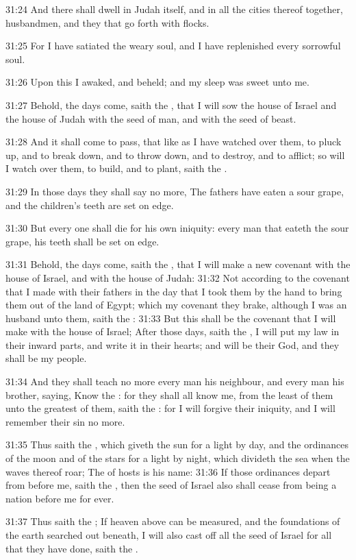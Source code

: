 31:24 And there shall dwell in Judah itself, and in all the cities thereof together, husbandmen, and they that go forth with flocks.

31:25 For I have satiated the weary soul, and I have replenished every sorrowful soul.

31:26 Upon this I awaked, and beheld; and my sleep was sweet unto me.

31:27 Behold, the days come, saith the \LORD, that I will sow the house of Israel and the house of Judah with the seed of man, and with the seed of beast.

31:28 And it shall come to pass, that like as I have watched over them, to pluck up, and to break down, and to throw down, and to destroy, and to afflict; so will I watch over them, to build, and to plant, saith the \LORD.

31:29 In those days they shall say no more, The fathers have eaten a sour grape, and the children's teeth are set on edge.

31:30 But every one shall die for his own iniquity: every man that eateth the sour grape, his teeth shall be set on edge.

31:31 Behold, the days come, saith the \LORD, that I will make a new covenant with the house of Israel, and with the house of Judah: 31:32 Not according to the covenant that I made with their fathers in the day that I took them by the hand to bring them out of the land of Egypt; which my covenant they brake, although I was an husband unto them, saith the \LORD: 31:33 But this shall be the covenant that I will make with the house of Israel; After those days, saith the \LORD, I will put my law in their inward parts, and write it in their hearts; and will be their God, and they shall be my people.

31:34 And they shall teach no more every man his neighbour, and every man his brother, saying, Know the \LORD: for they shall all know me, from the least of them unto the greatest of them, saith the \LORD: for I will forgive their iniquity, and I will remember their sin no more.

31:35 Thus saith the \LORD, which giveth the sun for a light by day, and the ordinances of the moon and of the stars for a light by night, which divideth the sea when the waves thereof roar; The \LORD of hosts is his name: 31:36 If those ordinances depart from before me, saith the \LORD, then the seed of Israel also shall cease from being a nation before me for ever.

31:37 Thus saith the \LORD; If heaven above can be measured, and the foundations of the earth searched out beneath, I will also cast off all the seed of Israel for all that they have done, saith the \LORD.

